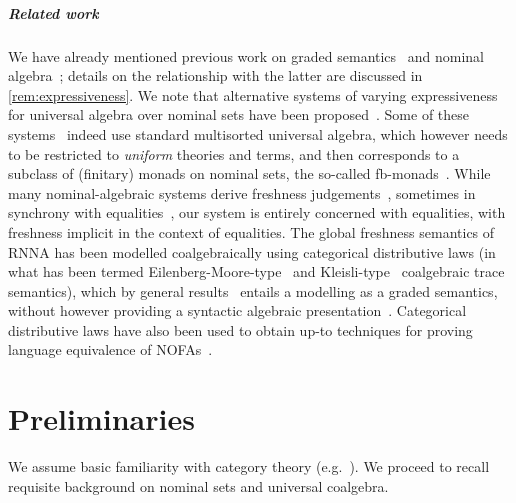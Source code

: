 \documentclass[a4paper,UKenglish,cleveref,thm-restate,numberwithinsect,final]{lipics-v2021}
\theoremstyle{plain}
\numberwithin{equation}{section}
\newcommand{\+}[1]{\mathcal{#1}\xspace}
\theoremstyle{definition}
\begin{document}
\subparagraph*{Related work} We have already mentioned previous work
on graded
semantics~\cite{MiliusEA15,DorschEA19,FordEA21,FordEA22,ForsterEA25a,ForsterEA25b}
and nominal algebra~\cite{GabbayMathijssen09}; details on the
relationship with the latter are discussed in
\cref{rem:expressiveness}. We note that alternative systems of varying
expressiveness for universal algebra over nominal sets have been
proposed~\cite{CloustonPitts07,KurzPetrisan10}. Some of these
systems~\cite{KurzPetrisan10,KurzEA10} indeed use standard multisorted
universal algebra, which however needs to be restricted to
\emph{uniform} theories and terms, and then corresponds to a subclass
of (finitary) monads on nominal sets, the so-called
fb-monads~\cite{KurzEA10}. While many nominal-algebraic systems derive
freshness
judgements~\cite{Gabbay09,GabbayMathijssen09,CloustonPitts07},
sometimes in synchrony with equalities~\cite{CloustonPitts07}, our
system is entirely concerned with equalities, with freshness implicit
in the context of equalities. The global freshness semantics of RNNA
has been modelled coalgebraically using categorical distributive laws
(in what has been termed Eilenberg-Moore-type~\cite{AdamekEA12} and
Kleisli-type~\cite{HasuoEA07} coalgebraic trace semantics), which by
general results~\cite{MiliusEA15} entails a modelling as a graded
semantics, without however providing a syntactic algebraic
presentation~\cite{FrankEA22}. Categorical distributive laws have also
been used to obtain up-to techniques for proving language equivalence
of NOFAs~\cite{BonchiEA14}. %

\section{Preliminaries}
\label{sec:prelims}
We assume basic familiarity with category theory
(e.g.~\cite{AdamekEA90}). We proceed to recall requisite background on
nominal sets and universal coalgebra.
\end{document}
